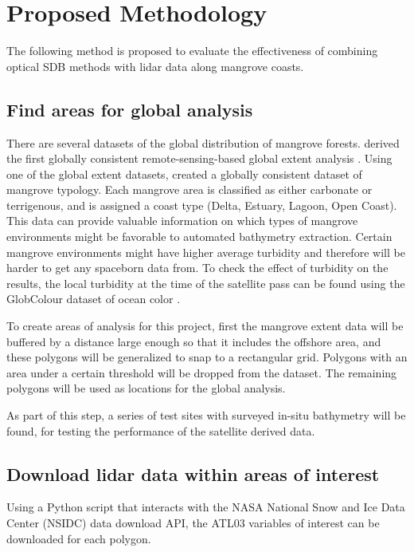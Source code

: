 \chapter{Proposed Methodology}


The following method is proposed to evaluate the effectiveness of combining optical SDB methods with lidar data along mangrove coasts.

\section{Find areas for global analysis}
There are several datasets of the global distribution of mangrove forests. \citeauthor{Giri2011b} derived the first globally consistent remote-sensing-based global extent analysis \parencite{Worthington2020}. Using one of the global extent datasets, \citeauthor{Worthington2020a} created a globally consistent dataset of mangrove typology. Each mangrove area is classified as either carbonate or terrigenous, and is assigned a coast type (Delta, Estuary, Lagoon, Open Coast). This data can provide valuable information on which types of mangrove environments might be favorable to automated bathymetry extraction. Certain mangrove environments might have higher average turbidity and therefore will be harder to get any spaceborn data from. To check the effect of turbidity on the results, the local turbidity at the time of the satellite pass can be found using the GlobColour dataset of ocean color \parencite{Garnesson2019}.

To create areas of analysis for this project, first the \citeauthor{Giri2011b} mangrove extent data will be buffered by a distance large enough so that it includes the offshore area, and these polygons will be generalized to snap to a rectangular grid. Polygons with an area under a certain threshold will be dropped from the dataset. The remaining polygons will be used as locations for the global analysis.

As part of this step, a series of test sites with surveyed in-situ bathymetry will be found, for testing the performance of the satellite derived data.

\section{Download lidar data within areas of interest}
Using a Python script that interacts with the NASA National Snow and Ice Data Center (NSIDC) data download API, the ATL03 variables of interest can be downloaded for each polygon.

